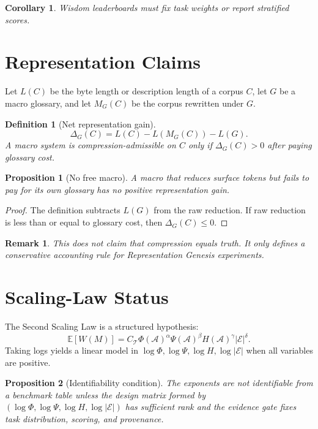 \documentclass[11pt]{article}
\newtheorem{definition}{Definition}
\newtheorem{proposition}{Proposition}
\newtheorem{corollary}{Corollary}
\newtheorem{remark}{Remark}
\begin{document}
\begin{corollary}
Wisdom leaderboards must fix task weights or report stratified scores.
\end{corollary}

\section{Representation Claims}

Let $L(C)$ be the byte length or description length of a corpus $C$, let $G$ be a macro glossary, and let $M_G(C)$ be the corpus rewritten under $G$.

\begin{definition}[Net representation gain]
\[
\Delta_G(C)=L(C)-L(M_G(C))-L(G).
\]
A macro system is compression-admissible on $C$ only if $\Delta_G(C)>0$ after paying glossary cost.
\end{definition}

\begin{proposition}[No free macro]
A macro that reduces surface tokens but fails to pay for its own glossary has no positive representation gain.
\end{proposition}

\begin{proof}
The definition subtracts $L(G)$ from the raw reduction.
If raw reduction is less than or equal to glossary cost, then $\Delta_G(C)\le 0$.
\end{proof}

\begin{remark}
This does not claim that compression equals truth.
It only defines a conservative accounting rule for Representation Genesis experiments.
\end{remark}

\section{Scaling-Law Status}

The Second Scaling Law is a structured hypothesis:
\[
\mathbb{E}[W(M)]
=C_{\mathcal{T}}\Phi(\mathcal{A})^{\alpha}\Psi(\mathcal{A})^{\beta}H(\mathcal{A})^{\gamma}|\mathcal{E}|^{\delta}.
\]
Taking logs yields a linear model in $\log \Phi,\log\Psi,\log H,\log|\mathcal{E}|$ when all variables are positive.

\begin{proposition}[Identifiability condition]
The exponents are not identifiable from a benchmark table unless the design matrix formed by $(\log \Phi,\log\Psi,\log H,\log|\mathcal{E}|)$ has sufficient rank and the evidence gate fixes task distribution, scoring, and provenance.
\end{proposition}
\end{document}
